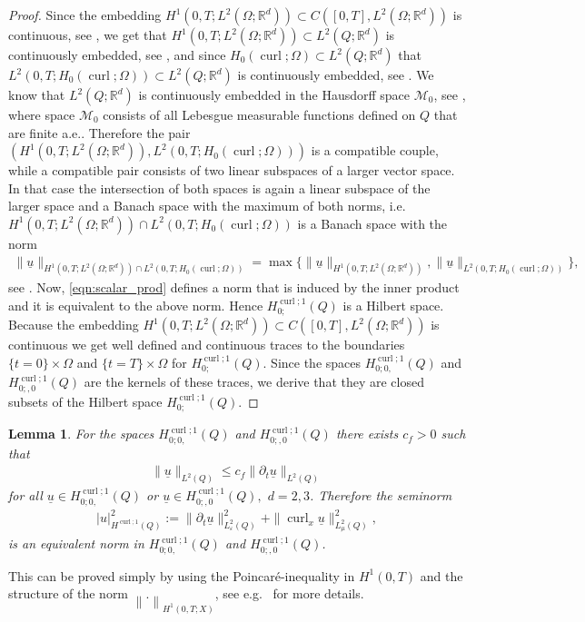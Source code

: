 \documentclass[a4paper,11pt]{article}
\newtheorem{lem}[thm]{Lemma}
\newcommand{\R}{\mathbb R}
\newcommand{\cu}{\operatorname{curl}}
\renewcommand{\vec}[1]{\underline{#1}}
\newcommand{\norm}[1]{{\left\lVert{#1}\right\rVert}}
\begin{document}
\begin{proof}
	Since the embedding $H^1(0,T;L^2(\Omega;\R^d)) \subset C([0,T], L^2(\Omega;\R^d))$ is continuous, see \cite[Prop 23.23]{zeidler},  we get that $
	H^1(0,T;L^2(\Omega;\R^d))\subset L^2(Q;\R^d)$	is continuously embedded, see \cite[Prop 23.2]{zeidler}, and since $H_0(\cu;\Omega) \subset L^2(Q;\R^d)$ that $
	L^2(0,T;H_0(\cu;\Omega))\subset L^2(Q;\R^d)$ is continuously embedded, see \cite[Prop 23.2]{zeidler}. We know that  $L^2(Q;\R^d)$ is continuously embedded in the Hausdorff space $\mathcal{M}_0$, see \cite[Thm.~I.1.4]{bennett},  where space $\mathcal{M}_0$ consists of all Lebesgue measurable functions defined on $Q$ that are finite a.e..  Therefore the pair $(H^1(0,T;L^2(\Omega;\R^d)), L^2(0,T;H_0(\cu;\Omega)))$ is a compatible couple,  while a compatible pair consists of two linear subspaces of a larger vector space. In that case the intersection of both spaces is again a linear subspace of the larger space and a Banach space with the maximum of both norms, i.e. $	H^1(0,T;L^2(\Omega;\R^d))\cap L^2(0,T;H_0(\cu;\Omega))$	is a Banach space with the norm
	\begin{align*}
		\| \vec u\|_{H^1(0,T;L^2(\Omega;\R^d))\cap L^2(0,T;H_0(\cu;\Omega))} = \max \{	\| \vec  u\|_{H^1(0,T;L^2(\Omega;\R^d))},	\|\vec  u\|_{ L^2(0,T;H_0(\cu;\Omega))} \},
	\end{align*}
	see \cite[Thm.~III.1.3]{bennett}. Now, \eqref{eqn:scalar_prod} defines a norm that is induced by the inner product and it is equivalent to the above norm. Hence $H^{\cu;1}_{0;}(Q)$ is a Hilbert space.\\
	Because the embedding $H^1(0,T;L^2(\Omega;\R^d)) \subset C([0,T], L^2(\Omega;\R^d))$ is continuous we get well defined and continuous traces to the boundaries $\{t=0\}\times \Omega$ and $\{t=T\}\times \Omega$ for $H^{\cu;1}_{0;}(Q)$. Since the spaces $H^{\cu;1}_{0;0,}(Q)$ and $H^{\cu;1}_{0;,0}(Q)$ are the kernels of these traces, we derive that they are closed subsets of the Hilbert space $	H^{\cu;1}_{0;}(Q)$.
\end{proof}

\begin{lem}\label{lem:friedrich}
	For the spaces $H^{\cu;1}_{0;0,}(Q)$ and $H^{\cu;1}_{0;,0}(Q)$ there  exists  $c_f>0$ such that
	\begin{align*}
		\|\vec u\|_{L^2(Q)} \leq c_f \|\partial_t \vec u\|_{L^2(Q)} 
	\end{align*}
	for all $\vec u\in H^{\cu;1}_{0;0,}(Q) $ or $\vec u\in H^{\cu;1}_{0;,0}(Q), $ $d=2,3$. Therefore the  seminorm
	\begin{align*}
		|u|^2_{H^{\cu;1}(Q)} := \|\partial_t\vec u\|^2_{L^2_\varepsilon(Q)}+\|\cu_x \vec u\|^2_{L^2_\mu(Q)},
	\end{align*}
	is an equivalent norm in $H^{\cu;1}_{0;0,}(Q)$ and $H^{\cu;1}_{0;,0}(Q)$.
\end{lem}
This can be  proved simply by using the Poincaré-inequality in $H^1(0,T)$ and the structure of the norm $\norm{.}_{H^1(0,T;X)}$, see e.g.~\cite[Sec.~4.1]{HauserZank2023} for more details.
\end{document}
